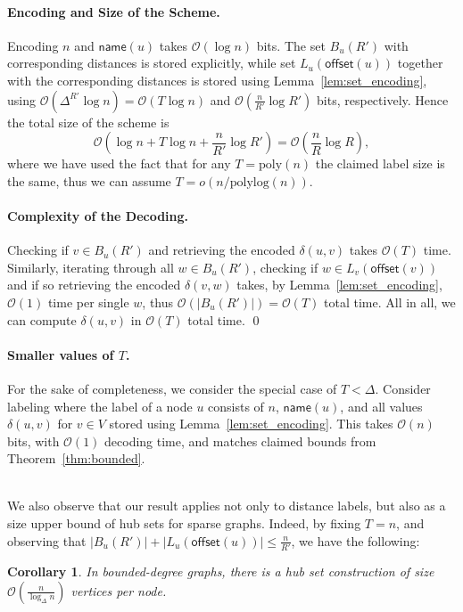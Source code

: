 \documentclass{article}[11pt,letter]
\newtheorem{corollary}[definition]{Corollary}
\newcommand{\bigo}{\mathcal{O}}
\newcommand{\symb}{R}
\newcommand{\offset}{\mathsf{offset}}
\newcommand{\name}{\mathsf{name}}
\newcommand{\cost}{\delta}
\begin{document}
\paragraph{Encoding and Size of the Scheme.} Encoding $n$ and $\name(u)$ takes $\bigo(\log n)$ bits.
The set $B_u(\symb')$ with corresponding distances is stored explicitly, while set $L_u(\offset(u))$ together with the corresponding distances is stored using Lemma~\ref{lem:set_encoding}, using $\bigo(\Delta^{R'}\log n) = \bigo(T \log n)$ and
$\bigo(\frac{n}{\symb'} \log \symb')$ bits, respectively.
Hence the total size of the scheme is 
\[\bigo(\log n+T\log n+\frac{n}{\symb'}\log \symb')=\bigo(\frac{n}{\symb}\log \symb ),\]
where we have used the fact that for any $T =  \text{poly}(n)$ the claimed label size is the same, thus we can assume $T = o(n/\text{polylog}(n))$.

\paragraph{Complexity of the Decoding.} Checking if $v\in B_u(\symb')$ and retrieving the encoded $\cost(u,v)$ takes $\bigo(T)$ time.
Similarly,  iterating through all $w\in B_u(\symb')$, checking if $w\in L_v(\offset(v))$ and
if so retrieving the encoded $\cost(v,w)$ takes, by Lemma~\ref{lem:set_encoding}, $\bigo(1)$ time per single $w$,  thus $\bigo(|B_u(\symb')|)=\bigo(T)$ total time.
All in all, we can compute $\cost(u,v)$ in $\bigo(T)$
total time.
\qed

\paragraph{Smaller values of $T$.} For the sake of completeness, we consider the special case of $T < \Delta$. Consider labeling where the label of a node
$u$ consists of $n$, $\name(u)$, and all values $\cost(u,v)$ for $v \in V$ stored using
Lemma~\ref{lem:set_encoding}. This takes $\bigo(n)$ bits, with $\bigo(1)$ decoding time, and matches claimed bounds from Theorem~\ref{thm:bounded}.

\ \\
We also observe that our result applies not only to distance labels, but also as a size upper bound of hub sets for sparse graphs. Indeed, by fixing $T = n$, and observing that $|B_u(R')| + |L_u(\offset(u))| \le \frac{n}{R'}$, we have the following:
\begin{corollary}
In bounded-degree graphs, there is a hub set construction of size $\bigo(\frac{n}{\log_{\Delta} n})$ vertices per node.
\end{corollary}
\end{document}
